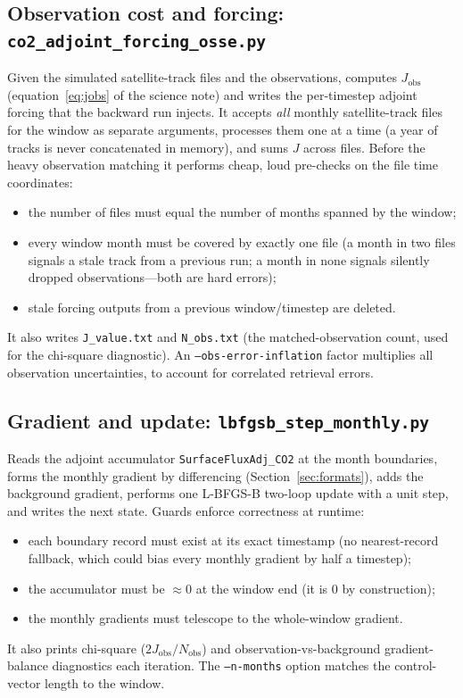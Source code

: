 \documentclass[11pt]{article}
\newcommand{\code}[1]{\texttt{#1}}
\begin{document}
\subsection{Observation cost and forcing: \code{co2\_adjoint\_forcing\_osse.py}}

Given the simulated satellite-track files and the observations, computes
$J_{\mathrm{obs}}$ (equation~\eqref{eq:jobs} of the science note) and writes the
per-timestep adjoint forcing that the backward run injects. It accepts \emph{all}
monthly satellite-track files for the window as separate arguments, processes them
one at a time (a year of tracks is never concatenated in memory), and sums $J$
across files. Before the heavy observation matching it performs cheap, loud
pre-checks on the file time coordinates:
\begin{itemize}[nosep]
  \item the number of files must equal the number of months spanned by the window;
  \item every window month must be covered by exactly one file (a month in two
        files signals a stale track from a previous run; a month in none signals
        silently dropped observations---both are hard errors);
  \item stale forcing outputs from a previous window/timestep are deleted.
\end{itemize}
It also writes \code{J\_value.txt} and \code{N\_obs.txt} (the matched-observation
count, used for the chi-square diagnostic). An \code{--obs-error-inflation}
factor multiplies all observation uncertainties, to account for correlated
retrieval errors.

\subsection{Gradient and update: \code{lbfgsb\_step\_monthly.py}}

Reads the adjoint accumulator \code{SurfaceFluxAdj\_CO2} at the month boundaries,
forms the monthly gradient by differencing (Section~\ref{sec:formats}), adds the
background gradient, performs one L-BFGS-B two-loop update with a unit step, and
writes the next state. Guards enforce correctness at runtime:
\begin{itemize}[nosep]
  \item each boundary record must exist at its exact timestamp (no nearest-record
        fallback, which could bias every monthly gradient by half a timestep);
  \item the accumulator must be $\approx 0$ at the window end (it is $0$ by
        construction);
  \item the monthly gradients must telescope to the whole-window gradient.
\end{itemize}
It also prints chi-square ($2J_{\mathrm{obs}}/N_{\mathrm{obs}}$) and
observation-vs-background gradient-balance diagnostics each iteration. The
\code{--n-months} option matches the control-vector length to the window.
\end{document}
